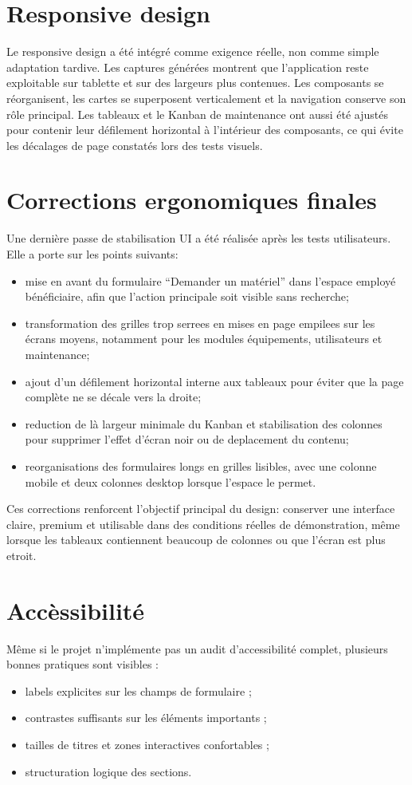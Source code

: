 \section{Responsive design}
Le responsive design a été intégré comme exigence réelle, non comme simple adaptation tardive. Les captures générées montrent que l'application reste exploitable sur tablette et sur des largeurs plus contenues. Les composants se réorganisent, les cartes se superposent verticalement et la navigation conserve son rôle principal. Les tableaux et le Kanban de maintenance ont aussi été ajustés pour contenir leur défilement horizontal à l'intérieur des composants, ce qui évite les décalages de page constatés lors des tests visuels.

\section{Corrections ergonomiques finales}
Une dernière passe de stabilisation UI a été réalisée après les tests utilisateurs. Elle a porte sur les points suivants:
\begin{itemize}
  \item mise en avant du formulaire \enquote{Demander un matériel} dans l'espace employé bénéficiaire, afin que l'action principale soit visible sans recherche;
  \item transformation des grilles trop serrees en mises en page empilees sur les écrans moyens, notamment pour les modules équipements, utilisateurs et maintenance;
  \item ajout d'un défilement horizontal interne aux tableaux pour éviter que la page complète ne se décale vers la droite;
  \item reduction de là largeur minimale du Kanban et stabilisation des colonnes pour supprimer l'effet d'écran noir ou de deplacement du contenu;
  \item reorganisations des formulaires longs en grilles lisibles, avec une colonne mobile et deux colonnes desktop lorsque l'espace le permet.
\end{itemize}

Ces corrections renforcent l'objectif principal du design: conserver une interface claire, premium et utilisable dans des conditions réelles de démonstration, même lorsque les tableaux contiennent beaucoup de colonnes ou que l'écran est plus etroit.

\section{Accèssibilité}
Même si le projet n'implémente pas un audit d'accessibilité complet, plusieurs bonnes pratiques sont visibles :
\begin{itemize}
  \item labels explicites sur les champs de formulaire ;
  \item contrastes suffisants sur les éléments importants ;
  \item tailles de titres et zones interactives confortables ;
  \item structuration logique des sections.
\end{itemize}

